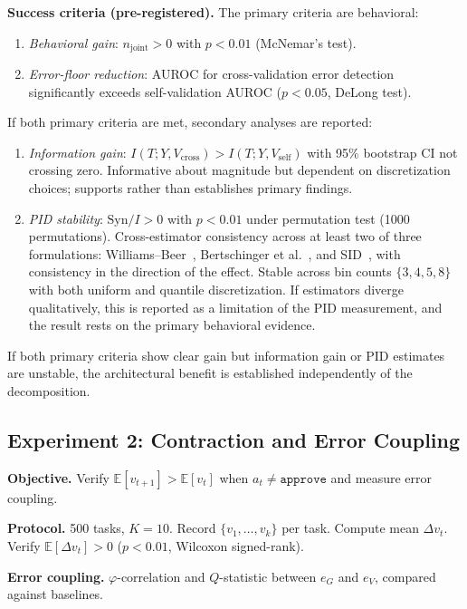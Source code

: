 \documentclass[11pt,a4paper]{article}
\theoremstyle{definition}
\begin{document}
\textbf{Success criteria (pre-registered).} The primary criteria are behavioral:
\begin{enumerate}[leftmargin=*,itemsep=2pt]
\item \emph{Behavioral gain}: $n_\text{joint} > 0$ with $p < 0.01$ (McNemar's test).
\item \emph{Error-floor reduction}: AUROC for cross-validation error detection significantly exceeds self-validation AUROC ($p < 0.05$, DeLong test).
\end{enumerate}
If both primary criteria are met, secondary analyses are reported:
\begin{enumerate}[leftmargin=*,itemsep=2pt,start=3]
\item \emph{Information gain}: $I(T; Y, V_\text{cross}) > I(T; Y, V_\text{self})$ with 95\% bootstrap CI not crossing zero. Informative about magnitude but dependent on discretization choices; supports rather than establishes primary findings.
\item \emph{PID stability}: $\mathrm{Syn}/I > 0$ with $p < 0.01$ under permutation test (1000 permutations). Cross-estimator consistency across at least two of three formulations: Williams--Beer~\cite{williams2010pid}, Bertschinger et al.~\cite{bertschinger2014pid}, and SID~\cite{lyu2025multivariate}, with consistency in the direction of the effect. Stable across bin counts $\{3,4,5,8\}$ with both uniform and quantile discretization. If estimators diverge qualitatively, this is reported as a limitation of the PID measurement, and the result rests on the primary behavioral evidence.
\end{enumerate}
If both primary criteria show clear gain but information gain or PID estimates are unstable, the architectural benefit is established independently of the decomposition.


\subsection{Experiment 2: Contraction and Error Coupling}

\textbf{Objective.} Verify $\mathbb{E}[v_{t+1}] > \mathbb{E}[v_t]$ when $a_t \neq \texttt{approve}$ and measure error coupling.

\textbf{Protocol.} 500 tasks, $K=10$. Record $\{v_1, \ldots, v_k\}$ per task. Compute mean $\Delta v_t$. Verify $\mathbb{E}[\Delta v_t] > 0$ ($p < 0.01$, Wilcoxon signed-rank).

\textbf{Error coupling.} $\varphi$-correlation and $Q$-statistic between $e_G$ and $e_V$, compared against baselines.
\end{document}
